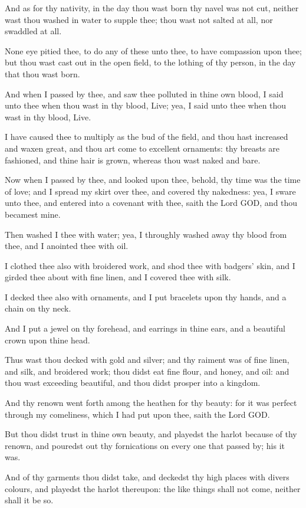 \verse And as for thy nativity, in the day thou wast born thy navel was not cut, neither wast thou washed in water to supple thee; thou wast not salted at all, nor swaddled at all.

\verse None eye pitied thee, to do any of these unto thee, to have compassion upon thee; but thou wast cast out in the open field, to the lothing of thy person, in the day that thou wast born.

\verse And when I passed by thee, and saw thee polluted in thine own blood, I said unto thee when thou wast in thy blood, Live; yea, I said unto thee when thou wast in thy blood, Live.

\verse I have caused thee to multiply as the bud of the field, and thou hast increased and waxen great, and thou art come to excellent ornaments: thy breasts are fashioned, and thine hair is grown, whereas thou wast naked and bare.

\verse Now when I passed by thee, and looked upon thee, behold, thy time was the time of love; and I spread my skirt over thee, and covered thy nakedness: yea, I sware unto thee, and entered into a covenant with thee, saith the Lord GOD, and thou becamest mine.

\verse Then washed I thee with water; yea, I throughly washed away thy blood from thee, and I anointed thee with oil.

\verse I clothed thee also with broidered work, and shod thee with badgers' skin, and I girded thee about with fine linen, and I covered thee with silk.

\verse I decked thee also with ornaments, and I put bracelets upon thy hands, and a chain on thy neck.

\verse And I put a jewel on thy forehead, and earrings in thine ears, and a beautiful crown upon thine head.

\verse Thus wast thou decked with gold and silver; and thy raiment was of fine linen, and silk, and broidered work; thou didst eat fine flour, and honey, and oil: and thou wast exceeding beautiful, and thou didst prosper into a kingdom.

\verse And thy renown went forth among the heathen for thy beauty: for it was perfect through my comeliness, which I had put upon thee, saith the Lord GOD.

\verse But thou didst trust in thine own beauty, and playedst the harlot because of thy renown, and pouredst out thy fornications on every one that passed by; his it was.

\verse And of thy garments thou didst take, and deckedst thy high places with divers colours, and playedst the harlot thereupon: the like things shall not come, neither shall it be so.

